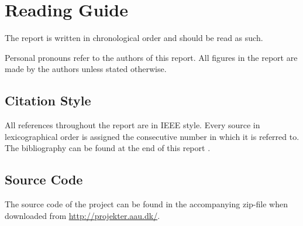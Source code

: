 \chapter*{Reading Guide}
The report is written in chronological order and should be read as such. 

Personal pronouns refer to the authors of this report. All figures in the report are made by the authors unless stated otherwise.

\section*{Citation Style}
All references throughout the report are in IEEE style. Every source in lexicographical order is assigned the consecutive number in which it is referred to. The bibliography can be found at the end of this report .

\section*{Source Code}
The source code of the project can be found in the accompanying zip-file when downloaded from \url{http://projekter.aau.dk/}.